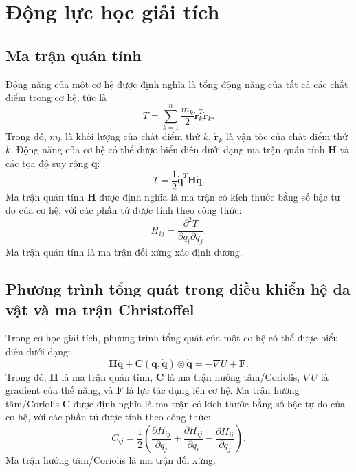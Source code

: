 \section{Động lực học giải tích}
\label{sec:10:Analytical_mechanics}

\subsection{Ma trận quán tính}

Động năng của một cơ hệ được định nghĩa là tổng động năng của tất cả các chất điểm trong cơ hệ, tức là
\begin{equation}
    T = \sum_{k=1}^{n} \dfrac{m_k}{2} \mathbf{\dot{r}}_k^T \mathbf{\dot{r}}_k.
\end{equation}
Trong đó, \(m_k\) là khối lượng của chất điểm thứ \(k\), \(\mathbf{\dot{r}}_k\) là vận tốc của chất điểm thứ \(k\).
Động năng của cơ hệ có thể được biểu diễn dưới dạng ma trận quán tính \(\mathbf{H}\) và các tọa độ suy rộng \(\mathbf{q}\):
\begin{equation}
    T = \dfrac{1}{2} \mathbf{\dot{q}}^T \mathbf{H} \mathbf{\dot{q}}.
\end{equation}
Ma trận quán tính \(\mathbf{H}\) được định nghĩa là ma trận có kích thước bằng số bậc tự do của cơ hệ, với các phần tử được tính theo công thức:
\begin{equation}
    H_{ij} = \dfrac{\partial^2 T}{\partial \dot{q}_i \partial \dot{q}_j}.
\end{equation}
Ma trận quán tính là ma trận đối xứng xác định dương.

\subsection{Phương trình tổng quát trong điều khiển hệ đa vật và ma trận Christoffel}

Trong cơ học giải tích, phương trình tổng quát của một cơ hệ có thể được biểu diễn dưới dạng:
\begin{equation}    
    \mathbf{H} \mathbf{\ddot{q}} + \mathbf{C} \left( \mathbf{q}, \mathbf{\dot{q}} \right) \otimes \mathbf{\dot{q}} = -\nabla U + \mathbf{F}.
\end{equation}
Trong đó, \(\mathbf{H}\) là ma trận quán tính, \(\mathbf{C}\) là ma trận hướng tâm/Coriolis, \(\nabla U\) là gradient của thế năng, và \(\mathbf{F}\) là lực tác dụng lên cơ hệ.
Ma trận hướng tâm/Coriolis \(\mathbf{C}\) được định nghĩa là ma trận có kích thước bằng số bậc tự do của cơ hệ, với các phần tử được tính theo công thức:
\begin{equation}
    C_{ij} = \dfrac{1}{2} \left( \dfrac{\partial H_{ij}}{\partial q_j} + \dfrac{\partial H_{ij}}{\partial q_i} - \dfrac{\partial H_{ii}}{\partial q_j} \right). 
\end{equation}
Ma trận hướng tâm/Coriolis là ma trận đối xứng.


